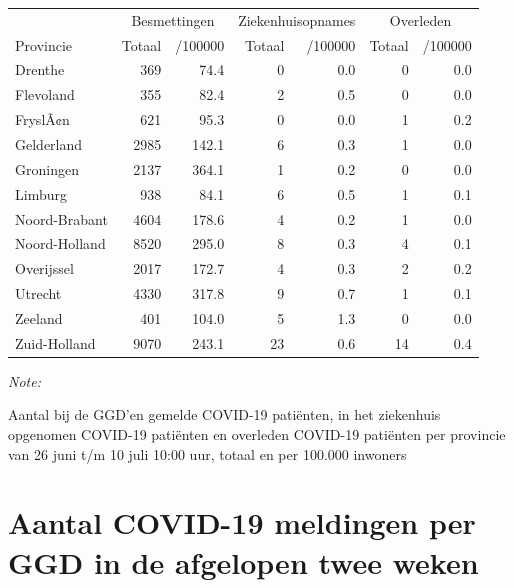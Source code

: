 \documentclass[
  english,
  man,floatsintext]{apa6}
\begin{document}
\begin{table}
\centering
\begin{threeparttable}
\begin{tabular}{lrrrrrr}
\toprule
\multicolumn{1}{c}{ } & \multicolumn{2}{c}{Besmettingen} & \multicolumn{2}{c}{Ziekenhuisopnames} & \multicolumn{2}{c}{Overleden} \\
\cmidrule(l{3pt}r{3pt}){2-3} \cmidrule(l{3pt}r{3pt}){4-5} \cmidrule(l{3pt}r{3pt}){6-7}
Provincie & Totaal & /100000 & Totaal & /100000 & Totaal & /100000\\
\midrule
Drenthe & 369 & 74.4 & 0 & 0.0 & 0 & 0.0\\
Flevoland & 355 & 82.4 & 2 & 0.5 & 0 & 0.0\\
FryslÃ¢n & 621 & 95.3 & 0 & 0.0 & 1 & 0.2\\
Gelderland & 2985 & 142.1 & 6 & 0.3 & 1 & 0.0\\
Groningen & 2137 & 364.1 & 1 & 0.2 & 0 & 0.0\\
Limburg & 938 & 84.1 & 6 & 0.5 & 1 & 0.1\\
Noord-Brabant & 4604 & 178.6 & 4 & 0.2 & 1 & 0.0\\
Noord-Holland & 8520 & 295.0 & 8 & 0.3 & 4 & 0.1\\
Overijssel & 2017 & 172.7 & 4 & 0.3 & 2 & 0.2\\
Utrecht & 4330 & 317.8 & 9 & 0.7 & 1 & 0.1\\
Zeeland & 401 & 104.0 & 5 & 1.3 & 0 & 0.0\\
Zuid-Holland & 9070 & 243.1 & 23 & 0.6 & 14 & 0.4\\
\bottomrule
\end{tabular}
\begin{tablenotes}
\item \textit{Note: } 
\item Aantal bij de GGD’en gemelde COVID-19 patiënten, in het ziekenhuis opgenomen COVID-19 patiënten en overleden COVID-19 patiënten per provincie van 26 juni t/m 10 juli 10:00 uur, totaal en per 100.000 inwoners
\end{tablenotes}
\end{threeparttable}
\end{table}

\newpage

\hypertarget{aantal-covid-19-meldingen-per-ggd-in-de-afgelopen-twee-weken}{%
\section{Aantal COVID-19 meldingen per GGD in de afgelopen twee weken}\label{aantal-covid-19-meldingen-per-ggd-in-de-afgelopen-twee-weken}}
\end{document}
